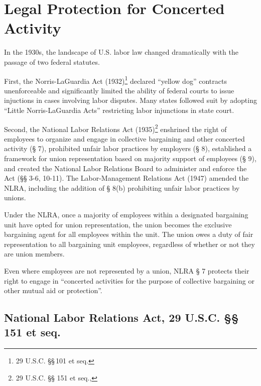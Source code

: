 \documentclass[
  letterpaper,
  11pt,
  DIV=9,
  openright]{scrbook}
\begin{document}
\section{Legal Protection for Concerted
Activity}\label{legal-protection-for-concerted-activity}

In the 1930s, the landscape of U.S. labor law changed dramatically with
the passage of two federal statutes.

First, the Norris-LaGuardia Act (1932)\footnote{29 U.S.C. §§\,101 et
  seq.} declared ``yellow dog'' contracts unenforceable and
significantly limited the ability of federal courts to issue injuctions
in cases involving labor disputes. Many states followed suit by adopting
``Little Norris-LaGuardia Acts'' restricting labor injunctions in state
court.

Second, the National Labor Relations Act (1935)\footnote{29 U.S.C. §§
  151 et seq.,} enshrined the right of employees to organize and engage
in collective bargaining and other concerted activity (§ 7), prohibited
unfair labor practices by employers (§ 8), established a framework for
union representation based on majority support of employees (§ 9), and
created the National Labor Relations Board to administer and enforce the
Act (§§ 3-6, 10-11). The Labor-Management Relations Act (1947) amended
the NLRA, including the addition of § 8(b) prohibiting unfair labor
practices by unions.

Under the NLRA, once a majority of employees within a designated
bargaining unit have opted for union representation, the union becomes
the exclusive bargaining agent for all employees within the unit. The
union owes a duty of fair representation to all bargaining unit
employees, regardless of whether or not they are union members.

Even where employees are not represented by a union, NLRA § 7 protects
their right to engage in ``concerted activities for the purpose of
collective bargaining or other mutual aid or protection''.

\subsection{National Labor Relations Act, 29 U.S.C. §§ 151 et
seq.}\label{national-labor-relations-act-29-u.s.c.-151-et-seq.}
\end{document}

